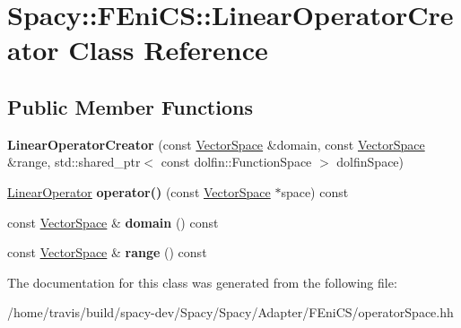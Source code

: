 \hypertarget{classSpacy_1_1FEniCS_1_1LinearOperatorCreator}{\section{\-Spacy\-:\-:\-F\-Eni\-C\-S\-:\-:\-Linear\-Operator\-Creator \-Class \-Reference}
\label{classSpacy_1_1FEniCS_1_1LinearOperatorCreator}
}
\subsection*{\-Public \-Member \-Functions}
\begin{DoxyCompactItemize}
\item 
\hypertarget{classSpacy_1_1FEniCS_1_1LinearOperatorCreator_ac95b6324d13993c0a8e2393a4521e14b}{{\bfseries \-Linear\-Operator\-Creator} (const \hyperlink{classSpacy_1_1VectorSpace}{\-Vector\-Space} \&domain, const \hyperlink{classSpacy_1_1VectorSpace}{\-Vector\-Space} \&range, std\-::shared\-\_\-ptr$<$ const dolfin\-::\-Function\-Space $>$ dolfin\-Space)}\label{classSpacy_1_1FEniCS_1_1LinearOperatorCreator_ac95b6324d13993c0a8e2393a4521e14b}

\item 
\hypertarget{classSpacy_1_1FEniCS_1_1LinearOperatorCreator_a2ef756542e2bab847054dc90726d1f50}{\hyperlink{classSpacy_1_1FEniCS_1_1LinearOperator}{\-Linear\-Operator} {\bfseries operator()} (const \hyperlink{classSpacy_1_1VectorSpace}{\-Vector\-Space} $\ast$space) const }\label{classSpacy_1_1FEniCS_1_1LinearOperatorCreator_a2ef756542e2bab847054dc90726d1f50}

\item 
\hypertarget{classSpacy_1_1FEniCS_1_1LinearOperatorCreator_a0eab2a20a95036e44e44dee2c64b3b26}{const \hyperlink{classSpacy_1_1VectorSpace}{\-Vector\-Space} \& {\bfseries domain} () const }\label{classSpacy_1_1FEniCS_1_1LinearOperatorCreator_a0eab2a20a95036e44e44dee2c64b3b26}

\item 
\hypertarget{classSpacy_1_1FEniCS_1_1LinearOperatorCreator_a9a26a81885dfe279565f48cee5fb43ed}{const \hyperlink{classSpacy_1_1VectorSpace}{\-Vector\-Space} \& {\bfseries range} () const }\label{classSpacy_1_1FEniCS_1_1LinearOperatorCreator_a9a26a81885dfe279565f48cee5fb43ed}

\end{DoxyCompactItemize}


\-The documentation for this class was generated from the following file\-:\begin{DoxyCompactItemize}
\item 
/home/travis/build/spacy-\/dev/\-Spacy/\-Spacy/\-Adapter/\-F\-Eni\-C\-S/operator\-Space.\-hh\end{DoxyCompactItemize}
